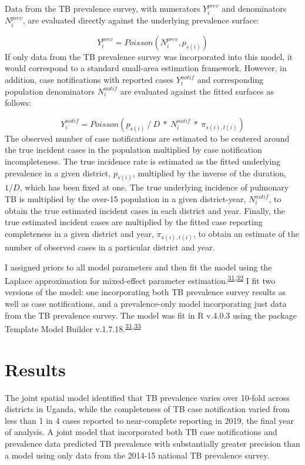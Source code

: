 \documentclass[
]{article}
\begin{document}
Data from the TB prevalence survey, with numerators \(Y^{prev}_i\) and denominators \(N^{prev}_i\), are evaluated directly against the underlying prevalence surface:

\[Y^{prev}_i = Poisson(N^{prev}_i, p_{s(i)})\]
If only data from the TB prevalence survey was incorporated into this model, it would correspond to a standard small-area estimation framework. However, in addition, case notifications with reported cases \(Y^{notif}_i\) and corresponding population denominators \(N^{notif}_i\) are evaluated against the fitted surfaces as follows:

\[Y^{notif}_i = Poisson(p_{s(i)} ~/~ D ~*~ N^{notif}_i ~*~ \pi_{s(i),t(i)})\]
The observed number of case notifications are estimated to be centered around the true incident cases in the population multiplied by case notification incompleteness. The true incidence rate is estimated as the fitted underlying prevalence in a given district, \(p_{s(i)}\), multiplied by the inverse of the duration, \(1/D\), which has been fixed at one. The true underlying incidence of pulmonary TB is multiplied by the over-15 population in a given district-year, \(N^{notif}_i\), to obtain the true estimated incident cases in each district and year. Finally, the true estimated incident cases are multiplied by the fitted case reporting completeness in a given district and year, \(\pi_{s(i),t(i)}\), to obtain an estimate of the number of observed cases in a particular district and year.

I assigned priors to all model parameters and then fit the model using the Laplace approximation for mixed-effect parameter estimation.\textsuperscript{\protect\hyperlink{ref-Kristensen2016}{31},\protect\hyperlink{ref-Thorson2016}{32}} I fit two versions of the model: one incorporating both TB prevalence survey results as well as case notifications, and a prevalence-only model incorporating just data from the TB prevalence survey. The model was fit in R v.4.0.3 using the package Template Model Builder v.1.7.18.\textsuperscript{\protect\hyperlink{ref-Kristensen2016}{31},\protect\hyperlink{ref-RCoreTeam2018}{33}}

\hypertarget{results}{%
\section{Results}\label{results}}

The joint spatial model identified that TB prevalence varies over 10-fold across districts in Uganda, while the completeness of TB case notification varied from less than 1 in 4 cases reported to near-complete reporting in 2019, the final year of analysis. A joint model that incorporated both TB case notifications and prevalence data predicted TB prevalence with substantially greater precision than a model using only data from the 2014-15 national TB prevalence survey.
\end{document}
